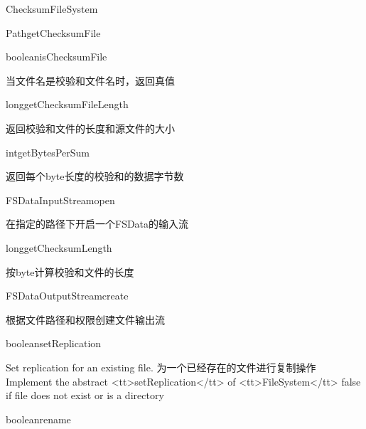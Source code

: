\begin{XeClass}{ChecksumFileSystem}
\begin{XeMethod}{\XePublic}{Path}{getChecksumFile}
    \end{XeMethod}

    \begin{XeMethod}{\XePublic}{boolean}{isChecksumFile}
         
 当文件名是校验和文件名时，返回真值

    \end{XeMethod}

    \begin{XeMethod}{\XePublic}{long}{getChecksumFileLength}
         
 返回校验和文件的长度和源文件的大小

    \end{XeMethod}

    \begin{XeMethod}{\XePublic}{int}{getBytesPerSum}
         
 返回每个byte长度的校验和的数据字节数

    \end{XeMethod}

    \begin{XeMethod}{\XePublic}{FSDataInputStream}{open}
         
 在指定的路径下开启一个FSData的输入流

    \end{XeMethod}

    \begin{XeMethod}{\XePublic}{long}{getChecksumLength}
         
 按byte计算校验和文件的长度

    \end{XeMethod}

    \begin{XeMethod}{\XePublic}{FSDataOutputStream}{create}
         
 根据文件路径和权限创建文件输出流

    \end{XeMethod}

    \begin{XeMethod}{\XePublic}{boolean}{setReplication}
         
 Set replication for an existing file.
 为一个已经存在的文件进行复制操作
 Implement the abstract <tt>setReplication</tt> of <tt>FileSystem</tt>
 false if file does not exist or is a directory

    \end{XeMethod}

    \begin{XeMethod}{\XePublic}{boolean}{rename}
         

\end{XeMethod}
\end{XeClass}

